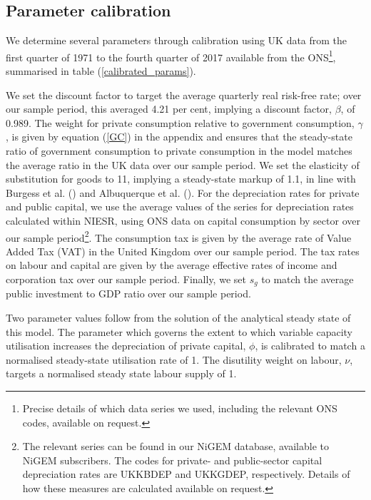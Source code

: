 \documentclass[titlepage, 11pt, a4paper]{article}
\renewcommand{\&}{and}
\begin{document}
\subsection{Parameter calibration} 
We determine several parameters through calibration using UK data from the first quarter of 1971 to the fourth quarter of 2017 available from the ONS\footnote{Precise details of which data series we used, including the relevant ONS codes, available on request.}, summarised in table (\ref{calibrated_params}). 

We set the discount factor to target the average quarterly real risk-free rate; over our sample period, this averaged 4.21 per cent, implying a discount factor, $\beta$, of 0.989. The weight for private consumption relative to government consumption, $\gamma$, is given by equation (\ref{GC}) in the appendix and ensures that the steady-state ratio of government consumption to private consumption in the model matches the average ratio in the UK data over our sample period. We set the elasticity of substitution for goods to 11, implying a steady-state markup of 1.1, in line with Burgess et al. (\citeyear{burgess2013bank}) and Albuquerque et al. (\citeyear{albuquerque2025decompositions}). For the depreciation rates for private and public capital, we use the average values of the series for depreciation rates calculated within NIESR, using ONS data on capital consumption by sector over our sample period\footnote{The relevant series can be found in our NiGEM database, available to NiGEM subscribers. The codes for private- and public-sector capital depreciation rates are UKKBDEP and UKKGDEP, respectively. Details of how these measures are calculated available on request.}. The consumption tax is given by the average rate of Value Added Tax (VAT) in the United Kingdom over our sample period. The tax rates on labour and capital are given by the average effective rates of income and corporation tax over our sample period.   Finally, we set $s_g$ to match the average public investment to GDP ratio over our sample period.\par 

Two parameter values follow from the solution of the analytical steady state of this model. The parameter which governs the extent to which variable capacity utilisation increases the depreciation of private capital, $\phi$, is calibrated to match a normalised steady-state utilisation rate of 1. The disutility weight on labour, $\nu$, targets a normalised steady state labour supply of 1.
\end{document}
